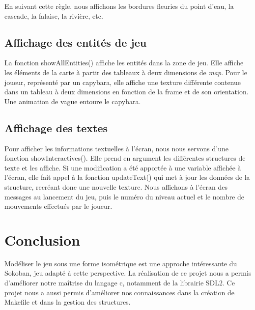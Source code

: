 \documentclass[french, 12pt]{article}
\begin{document}
    En suivant cette règle, nous affichons les bordures fleuries du point d'eau, la cascade, la falaise, la rivière, etc.

    \subsection{Affichage des entités de jeu}

    La fonction showAllEntities() affiche les entités dans la zone de jeu.
    Elle affiche les éléments de la carte à partir des tableaux à deux dimensions de \textit{map}.
    Pour le joueur, représenté par un capybara, elle affiche une texture différente contenue dans un tableau à deux dimensions en fonction de la frame et de son orientation. Une animation de vague entoure le capybara.

    \subsection{Affichage des textes}

    Pour afficher les informations textuelles à l'écran, nous nous servons d'une fonction showInteractives(). Elle prend en argument les différentes structures de texte et les affiche. Si une modification a été apportée à une variable affichée à l'écran, elle fait appel à la fonction updateText() qui met à jour les données de la structure, recréant donc une nouvelle texture.
    Nous affichons à l'écran des messages au lancement du jeu, puis le numéro du niveau actuel et le nombre de mouvements effectués par le joueur.

\section{Conclusion}

Modéliser le jeu sous une forme isométrique est une approche intéressante du Sokoban, jeu adapté à cette perspective. La réalisation de ce projet nous a permis d'améliorer notre maîtrise du langage c, notamment de la librairie SDL2. Ce projet nous a aussi permis d'améliorer nos connaissances dans la création de Makefile et dans la gestion des structures.
\end{document}
